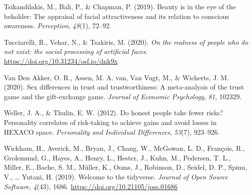 \documentclass[
  man,mask,floatsintext]{apa6}
\newlength{\cslhangindent}
\newlength{\cslentryspacingunit} %
\newenvironment{CSLReferences}[2] %
 {%
  \setlength{\parindent}{0pt}
  \ifodd #1
  \let\oldpar\par
  \def\par{\hangindent=\cslhangindent\oldpar}
  \fi
  \setlength{\parskip}{#2\cslentryspacingunit}
 }%
 {}
\begin{document}
\begin{CSLReferences}{1}{0}
\leavevmode{}%
Tsikandilakis, M., Bali, P., \& Chapman, P. (2019). Beauty is in the eye of the beholder: The appraisal of facial attractiveness and its relation to conscious awareness. \emph{Perception}, \emph{48}(1), 72--92.

\leavevmode{}%
Tucciarelli, R., Vehar, N., \& Tsakiris, M. (2020). \emph{On the realness of people who do not exist: the social processing of artificial faces}. \url{https://doi.org/10.31234/osf.io/dnk9x}

\leavevmode{}%
Van Den Akker, O. R., Assen, M. A. van, Van Vugt, M., \& Wicherts, J. M. (2020). Sex differences in trust and trustworthiness: A meta-analysis of the trust game and the gift-exchange game. \emph{Journal of Economic Psychology}, \emph{81}, 102329.

\leavevmode{}%
Weller, J. A., \& Thulin, E. W. (2012). Do honest people take fewer risks? Personality correlates of risk-taking to achieve gains and avoid losses in HEXACO space. \emph{Personality and Individual Differences}, \emph{53}(7), 923--926.

\leavevmode{}%
Wickham, H., Averick, M., Bryan, J., Chang, W., McGowan, L. D., François, R., Grolemund, G., Hayes, A., Henry, L., Hester, J., Kuhn, M., Pedersen, T. L., Miller, E., Bache, S. M., Müller, K., Ooms, J., Robinson, D., Seidel, D. P., Spinu, V., \ldots{} Yutani, H. (2019). Welcome to the {tidyverse}. \emph{Journal of Open Source Software}, \emph{4}(43), 1686. \url{https://doi.org/10.21105/joss.01686}

\end{CSLReferences}


\clearpage
\renewcommand{\listfigurename}{Figure captions}
\end{document}
